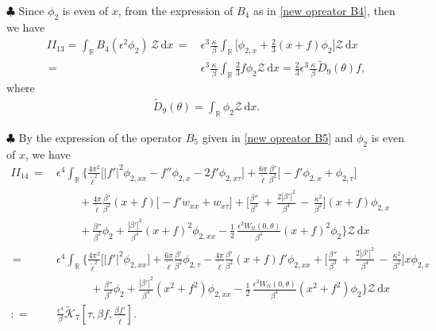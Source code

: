 \documentclass[10pt, reqno]{amsart}
\numberwithin{equation}{section}
\theoremstyle{definition}
\begin{document}
{\smallskip\noindent
$\clubsuit$
Since $\phi_2$ is even of $x$, from the expression of $ B_4$ as in \eqref{new opreator B4}, then we have
\begin{align}\label{B4phi2 intergral Z}
 II_{13}
 =\int_{{\mathbb R}} B_4(\epsilon^2\phi_2)\,{\mathcal Z} \,{\mathrm d}x
 \,=\,& \epsilon^3 \frac{\kappa}{\, \beta\, }\int_{{\mathbb R}} \Big[ \phi_{2,x} +\frac{2}{3} (x+f)\phi_2\Big]\mathcal Z \,{\mathrm d}x
\nonumber\\[2mm]
 \,=\,&\epsilon^3 \frac{\kappa}{\, \beta\, }\int_{{\mathbb R}} \frac{2}{3} f\phi_2\mathcal Z \,{\mathrm d}x=
 \frac{2}{3} \epsilon^3 \frac{\kappa}{\, \beta\, } \tilde {D}_9 (\theta) f,
\end{align}
 where
\begin{align*}
 \tilde {D}_9 (\theta) = \int_{{\mathbb R}} \phi_2\mathcal Z \,{\mathrm d}x.
\end{align*}


\smallskip\noindent
$\clubsuit$
By the expression of the operator $B_5$ given in \eqref{new opreator B5} and $\phi_2$ is even of $x$, we have
\begin{align} \label{B5phi2 intergral Z}
II_{14}
\,=\,&\epsilon^4\int_{\mathbb R}\Bigg\{\frac{4\pi^2}{{\tilde\ell}^2}\Big[|f'|^2 \phi_{2, xx} -f''\phi_{2, x} -2f' \phi_{2, x\tau}\Big]
+\frac{6\pi}{{\tilde\ell}}\frac{\beta'} {\beta^2}\Big[- f' \phi_{2, x} +\phi_{2, \tau}\Big]
\nonumber\\[2mm]
&\qquad
+ \frac{4\pi}{{\tilde\ell}} \frac{\beta'}{\beta^2} (x+f)\big[- f' w_{xx} +w_{x\tau}\big]
+\Big[
\frac{\beta''}{\beta^3}\,+\,\frac{2|\beta'|^2}{\beta^4} \,-\,\frac{\kappa^2}{\beta^2} \Big] (x+f) \phi_{2, x}
\nonumber\\[2mm]
&\qquad
+\frac{\beta''}{\beta^3}\phi_2
+ \frac{|\beta'|^2}{\beta^4}(x+f)^2 \phi_{2, xx}
-\frac{1}{2}\, \frac{\epsilon^2 W_{tt}(0, \theta)}{\beta^4} (x+f)^2\phi_2 \Bigg\} \mathcal Z \,{\mathrm d}x
\nonumber\\[2mm]
\,=\,&\epsilon^4 \int_{\mathbb R}\Bigg\{\frac{4\pi^2}{{\tilde\ell}^2}\Big[|f'|^2 \phi_{2, xx} \Big]
+\frac{6\pi}{{\tilde\ell}}\frac{\beta'} {\beta^2} \phi_{2, \tau}
- \frac{4\pi}{{\tilde\ell}} \frac{\beta'}{\beta^2} (x+f) f' \phi_{2, xx}
+\Big[
\frac{\beta''}{\beta^3}\,+\,\frac{2|\beta'|^2}{\beta^4} \,-\,\frac{\kappa^2}{\beta^2} \Big] x\phi_{2, x}
\nonumber\\[2mm]
&\qquad\quad
+ \frac{\beta''}{\beta^3}\phi_2
+ \frac{|\beta'|^2}{\beta^4} (x^2+f^2) \phi_{2, xx}
-\frac{1}{2}\,\frac{ \epsilon^2W_{tt}(0, \theta)}{\beta^4} (x^2+f^2)\phi_2 \Bigg\} \mathcal Z \,{\mathrm d}x
\nonumber\\[2mm]
 : =\,& \frac{\epsilon^4}{\beta}\tilde{\mathcal K}_7\left[\tau, \beta{ f}, \frac{\beta{f}'}{\tilde\ell}\right].
\end{align}








}
\end{document}
